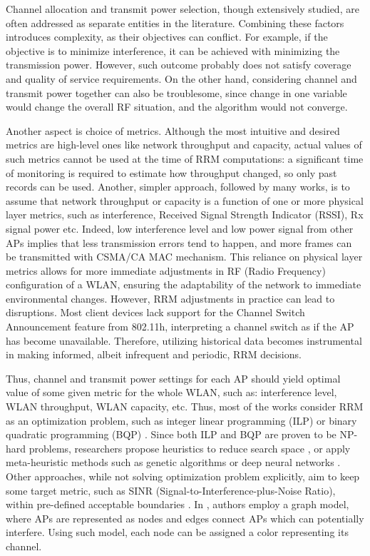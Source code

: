 Channel allocation and transmit power selection, though extensively studied, are often addressed as separate entities in the literature. Combining these factors introduces complexity, as their objectives can conflict. For example, if the objective is to minimize interference, it can be achieved with minimizing the transmission power. However, such outcome probably does not satisfy coverage and quality of service requirements. On the other hand, considering channel and transmit power together can also be troublesome, since change in one variable would change the overall RF situation, and the algorithm would not converge.

Another aspect is choice of metrics. Although the most intuitive and desired metrics are high-level ones like network throughput and capacity, actual values of such metrics cannot be used at the time of RRM computations: a significant time of monitoring is required to estimate how throughput changed, so only past records can be used. Another, simpler approach, followed by many works, is to assume that network throughput or capacity is a function of one or more physical layer metrics, such as interference, Received Signal Strength Indicator (RSSI), Rx signal power etc. Indeed, low interference level and low power signal from other APs implies that less transmission errors tend to happen, and more frames can be transmitted with CSMA/CA MAC mechanism.
This reliance on physical layer metrics allows for more immediate adjustments in RF (Radio Frequency) configuration of a WLAN, ensuring the adaptability of the network to immediate environmental changes.
However, RRM adjustments in practice can lead to disruptions. Most client devices lack support for the Channel Switch Announcement feature from 802.11h, interpreting a channel switch as if the AP has become unavailable. Therefore, utilizing historical data becomes instrumental in making informed, albeit infrequent and periodic, RRM decisions.

Thus, channel and transmit power settings for each AP should yield optimal value of some given metric for the whole WLAN, such as: interference level, WLAN throughput, WLAN capacity, etc. Thus, most of the works consider RRM as an optimization problem, such as integer linear programming (ILP) \cite{leeOptimizationAPPlacement2002} \cite{rodriguesDesignCapacityPlanning2000} or binary quadratic programming (BQP) \cite{leeDeepLearningAidedChannel2023}.
Since both ILP and BQP are proven to be NP-hard problems, researchers propose heuristics to reduce search space \cite{levantiCAPWAPCompliantSolutionRadio2007}, or apply meta-heuristic methods such as genetic algorithms \cite{raschellaEvaluationChannelAssignment2019} or deep neural networks \cite{leeDeepLearningAidedChannel2023}. Other approaches, while not solving optimization problem explicitly, aim to keep some target metric, such as SINR (Signal-to-Interference-plus-Noise Ratio), within pre-defined acceptable boundaries \cite{michalskiSimplePerformanceboostingAlgorithm2016}.
In \cite{aruneshmishraWeightedColoringBased2005}, authors employ a graph model, where APs are represented as nodes and edges connect APs which can potentially interfere. Using such model, each node can be assigned a color representing its channel.


